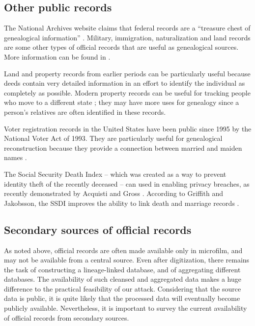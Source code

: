 \documentclass{article}
\begin{document}
\subsection{Other public records}

The National Archives website claims that federal records are a ``treasure chest of genealogical information'' \cite{nara-faq}. Military, immigration, naturalization and land records are some other types of official records that are useful as genealogical sources. 
More information can be found in \cite{nara-faq}. 

Land and property records from earlier periods can be particularly useful because deeds contain very detailed information in an effort to identify the individual as completely as possible. Modern property records can be useful for tracking people who move to a different state \cite{messing}; they may have more uses for genealogy since a person's relatives are often identified in these records. 

Voter registration records in the United States have been public since 1995 by the National Voter Act of 1993. They are particularly useful for genealogical reconstruction because they provide a connection between married and maiden names \cite{messing}.

The Social Security Death Index -- which was created as a way to prevent identity theft of the recently deceased -- can used in enabling privacy breaches, as recently demonstrated by Acquisti and Gross \cite{acquisti-ssn}. According to Griffith and Jakobsson, the SSDI improves the ability to link death and marriage records \cite{messing}.

\subsection{Secondary sources of official records}

As noted above, official records are often made available only in microfilm, and may not be available from a central source. Even after digitization, there remains the task of constructing a lineage-linked database, and of aggregating different databases. The availability of such cleansed and aggregated data makes a huge difference to the practical feasibility of our attack. Considering that the source data is public, it is quite likely that the processed data will eventually become publicly available. Nevertheless, it is important to survey the current availability of official records from secondary sources.
\end{document}
